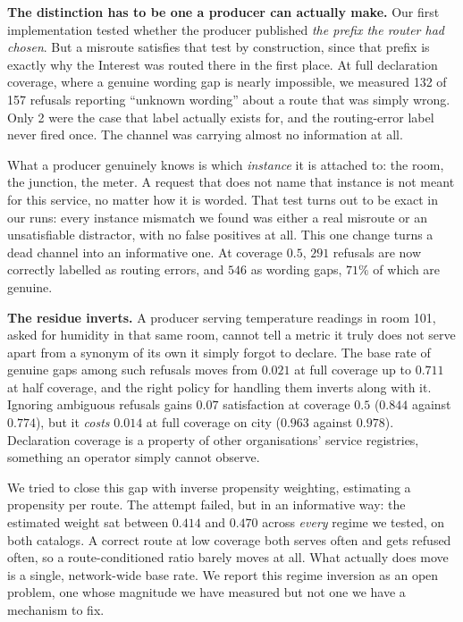 \documentclass[conference]{IEEEtran}
\begin{document}
		\textbf{The distinction has to be one a producer can actually make.} Our
		first implementation tested whether the producer published \emph{the
			prefix the router had chosen}. But a misroute satisfies that test by
		construction, since that prefix is exactly why the Interest was routed
		there in the first place. At full declaration coverage, where a genuine
		wording gap is nearly impossible, we measured 132 of 157 refusals
		reporting ``unknown wording'' about a route that was simply wrong. Only 2
		were the case that label actually exists for, and the routing-error label
		never fired once. The channel was carrying almost no information at all.
		
		What a producer genuinely knows is which \emph{instance} it is attached
		to: the room, the junction, the meter. A request that does not name that
		instance is not meant for this service, no matter how it is worded. That
		test turns out to be exact in our runs: every instance mismatch we found
		was either a real misroute or an unsatisfiable distractor, with no false
		positives at all. This one change turns a dead channel into an
		informative one. At coverage $0.5$, $291$ refusals are now correctly
		labelled as routing errors, and $546$ as wording gaps, $71\%$ of which are
		genuine.
		
		\textbf{The residue inverts.} A producer serving temperature readings in
		room 101, asked for humidity in that same room, cannot tell a metric it
		truly does not serve apart from a synonym of its own it simply forgot to
		declare. The base rate of genuine gaps among such refusals moves from
		$0.021$ at full coverage up to $0.711$ at half coverage, and the right
		policy for handling them inverts along with it. Ignoring ambiguous
		refusals gains $0.07$ satisfaction at coverage $0.5$ ($0.844$ against
		$0.774$), but it \emph{costs} $0.014$ at full coverage on city ($0.963$
		against $0.978$). Declaration coverage is a property of other
		organisations' service registries, something an operator simply cannot
		observe.
		
		We tried to close this gap with inverse propensity weighting, estimating
		a propensity per route. The attempt failed, but in an informative way:
		the estimated weight sat between $0.414$ and $0.470$ across \emph{every}
		regime we tested, on both catalogs. A correct route at low coverage both
		serves often and gets refused often, so a route-conditioned ratio barely
		moves at all. What actually does move is a single, network-wide base
		rate. We report this regime inversion as an open problem, one whose
		magnitude we have measured but not one we have a mechanism to fix.
		
\end{document}

